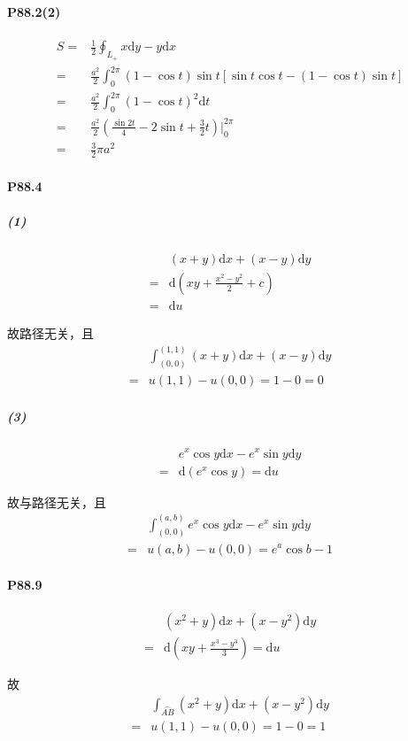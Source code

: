 \documentclass[UTF8]{ctexart}
\begin{document}
\paragraph*{P88.2(2)}
\begin{align*}
    S =& \frac{1}{2} \oint_{L_+} x \mathrm{d}y -y \mathrm{d}x \\
    =& \frac{a^2}{2} \int_{0}^{2\pi} (1-\cos t) \sin t [\sin t \cos t -(1-\cos t)\sin t] \\
    =& \frac{a^2}{2} \int_{0}^{2\pi} (1-\cos t) ^ 2 \mathrm{d}t \\
    =& \frac{a^2}{2}\left(\frac{\sin 2t}{4} - 2 \sin t + \frac{3}{2} t \right) \big|_{0}^{2\pi}\\
    =& \frac{3}{2} \pi a^2
\end{align*}
\paragraph*{P88.4}
\subparagraph*{(1)}
\begin{align*}
    &(x+y)\mathrm{d}x+(x-y)\mathrm{d}y \\
    =& \mathrm{d}(xy + \frac{x^2-y^2}{2} + c) \\
    =& \mathrm{d}u
\end{align*}

故路径无关，且
\begin{align*}
    &\int_{(0,0)}^{(1,1)} (x+y)\mathrm{d}x+(x-y)\mathrm{d}y \\
    =& u(1,1) - u(0, 0) = 1 - 0 = 0
\end{align*}
\subparagraph*{(3)}
\begin{align*}
    &e^x\cos y \mathrm{d}x - e^x \sin y \mathrm{d}y \\
    =& \mathrm{d}(e^x \cos y) = \mathrm{d}u
\end{align*}

故与路径无关，且
\begin{align*}
    &\int_{(0,0)}^{(a,b)} e^x \cos y \mathrm{d}x - e^x \sin y \mathrm{d}y \\
    =& u(a,b) - u(0, 0) = e^a \cos b - 1
\end{align*}
\paragraph*{P88.9}
\begin{align*}
    & (x^2+y)\mathrm{d}x + (x - y^2) \mathrm{d}y \\
    =& \mathrm{d}\left(xy+\frac{x^3 -y ^3}{3} \right) = \mathrm{d}u
\end{align*}

故
\begin{align*}
    &\int_{\overset{\frown}{AB}}^{} (x^2+y)\mathrm{d}x + (x - y^2) \mathrm{d}y \\
    =& u(1,1) - u(0, 0) = 1 - 0 = 1
\end{align*}
\end{document}

